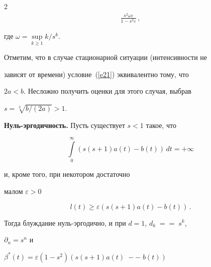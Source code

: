 \begin{multicols}{2}
\begin{align*}
 \frac{s^2\omega\varepsilon}{1-s^2\varepsilon }\,,




\end{align*}


где $\omega = \sup\limits_{k \ge 1} k/s^k$.





\medskip





Отметим, что в случае стационарной ситуации (интенсивности не


зависят от времени) условие~(\ref{e21}) эквивалентно тому, что 


$2a <b$. Несложно получить оценки для этого  случая, выбрав 


 $s =\sqrt[3]{b/(2a)} > 1$.





\bigskip





{\bf Нуль-эргодичность.} Пусть существует $s<1$ такое, что


\begin{equation*}


 \int\limits_{0}^{\infty}\left(s(s+1)a(t) - b(t)\right)\, dt=+\infty




\end{equation*} 


и, кроме того, при некотором достаточно


малом $\varepsilon > 0$ 


\begin{equation*} 


l(t) \ge \varepsilon


\left(s(s+1)a(t) - b(t)\right)\,. 




\end{equation*}


Тогда блуждание  нуль-эргодично, и при $d=1$, $d_k\;=$\linebreak $=\;s^k$,


${\partial}_n = s^n$ и


$\beta^* (t)= \varepsilon \left(1-s^2\right)


\left(s(s+1)a(t)\;-{}\right.$\linebreak $\left. -\;b(t)\right)$ 



\end{multicols}
